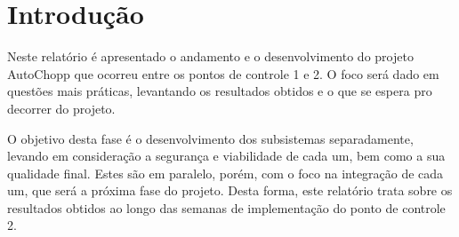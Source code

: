 \chapter[Introdução]{Introdução}

    Neste relatório é apresentado o andamento e o desenvolvimento do projeto AutoChopp que
    ocorreu entre os pontos de controle 1 e 2. O foco será dado em questões mais práticas,
    levantando os resultados obtidos e o que se espera pro decorrer do projeto.

    O objetivo desta fase é o desenvolvimento dos subsistemas separadamente, levando em
    consideração a segurança e viabilidade de cada um, bem como a sua qualidade final.
    Estes são em  paralelo, porém, com o foco na integração de cada um, que será a próxima 
    fase do projeto. Desta forma, este relatório trata sobre os resultados obtidos
    ao longo das semanas de implementação do ponto de controle 2.